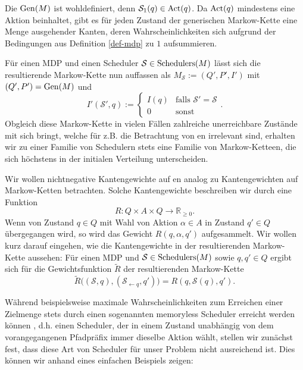 \documentclass[a4paper]{article}
\newcommand{\mc}{Markow-Kette}
\theoremstyle{nonumberplain}
\begin{document}
Die \gmc{} $\mathrm{Gen}(M)$ ist wohldefiniert, denn $\mathcal{S}_1(q) \in \mathrm{Act}(q)$. Da $\mathrm{Act}(q)$ mindestens eine Aktion beinhaltet, gibt es für jeden Zustand der generischen \mc{} eine Menge ausgehender Kanten, deren Wahrscheinlichkeiten sich aufgrund der Bedingungen aus Definition \ref{def-mdp} zu $1$ aufsummieren. 

Für einen MDP \mdpex{} und einen Scheduler $\mathcal{S}\in \mathrm{Schedulers}(M)$ lässt sich die resultierende \mc{} nun auffassen als $M_\mathcal{S} := (Q',P',I')$ mit $(Q',P') = \mathrm{Gen}(M)$ und
\begin{equation}
	I'(\mathcal{S}',q) := \begin{cases}
		I(q) & \text{falls }\mathcal{S}'=\mathcal{S}\\
		0 & \text{sonst}
	\end{cases}\text{.}
\end{equation}
Obgleich diese \mc{} in vielen Fällen zahlreiche unerreichbare Zustände mit sich bringt, welche für z.B. die Betrachtung von \var{}en irrelevant sind, erhalten wir zu einer Familie von Schedulern stets eine Familie von \mc{}en, die sich höchstens in der initialen Verteilung unterscheiden.

Wir wollen nichtnegative Kantengewichte auf \mdp{}en analog zu Kantengewichten auf \mc{}n betrachten. Solche Kantengewichte beschreiben wir durch eine Funktion
\begin{equation}
R : Q \times A \times Q \to \mathbb{R}_{\geq 0}\text{.}
\end{equation}
Wenn von Zustand $q\in Q$ mit Wahl von Aktion $\alpha\in A$ in Zustand $q'\in Q$ übergegangen wird, so wird das Gewicht $R(q,\alpha,q')$ aufgesammelt. 
Wir wollen kurz darauf eingehen, wie die Kantengewichte in der resultierenden \mc{} aussehen: Für einen MDP \mdpex{} und $\mathcal{S} \in \mathrm{Schedulers}(M)$ sowie $q,q' \in Q$ ergibt sich für die Gewichtsfunktion $\tilde{R}$ der resultierenden \mc{}
\begin{equation}
	\tilde{R}\big((\mathcal{S},q), (\mathcal{S}_{\leftarrow q},q')\big) = R(q,\mathcal{S}(q),q') \text{.}
\end{equation}


Während beispielsweise maximale Wahrscheinlichkeiten zum Erreichen einer Zielmenge stets durch einen sogenannten memoryless Scheduler erreicht werden können \cite{Bai08}, d.h. einen Scheduler, der in einem Zustand unabhängig von dem vorangegangenen Pfadpräfix immer dieselbe Aktion wählt, stellen wir zunächst fest, dass diese Art von Scheduler für unser Problem nicht ausreichend ist. Dies können wir anhand eines einfachen Beispiels zeigen:
\end{document}
